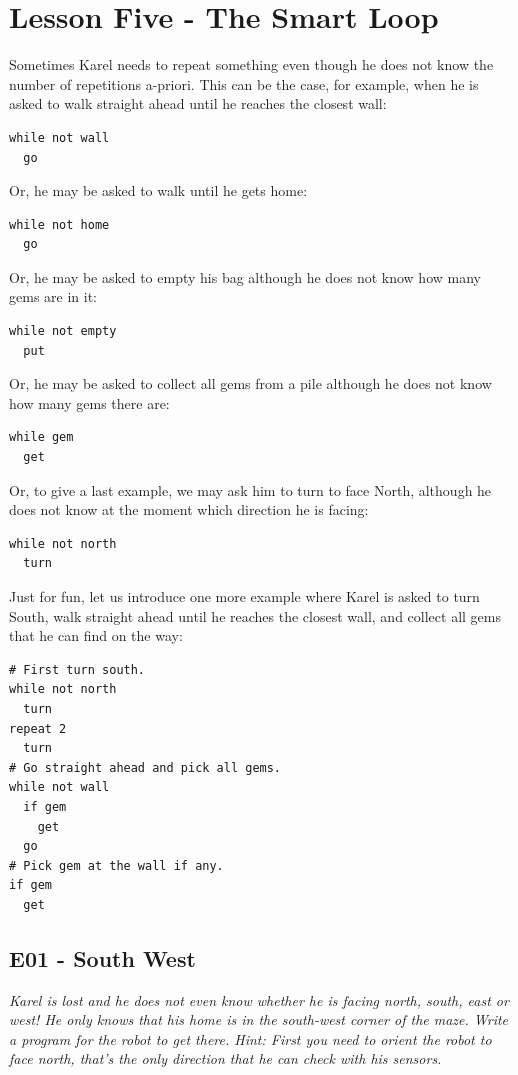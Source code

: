 \documentclass[article,A4,12pt]{llncs}
\begin{document}
\section{Lesson Five - The Smart Loop}

Sometimes Karel needs to repeat something even though he does not know 
the number of repetitions a-priori. This can be the case, for example, 
when he is asked to walk straight ahead until he reaches the closest wall:

\begin{verbatim}
while not wall
  go
\end{verbatim}
Or, he may be asked to walk until he gets home:

\begin{verbatim}
while not home
  go
\end{verbatim}
Or, he may be asked to empty his bag although he does not know how 
many gems are in it: 
 
\begin{verbatim}
while not empty
  put
\end{verbatim}
Or, he may be asked to collect all gems from a pile although he does
not know how many gems there are:

\begin{verbatim}
while gem
  get
\end{verbatim}
Or, to give a last example, we may ask him to turn to face North, 
although he does not know at the moment which direction he is
facing:

\begin{verbatim}
while not north
  turn
\end{verbatim}
Just for fun, let us introduce one more example where Karel is asked to 
turn South, walk straight ahead until he reaches the closest wall, and 
collect all gems that he can find on the way:

\begin{verbatim}
# First turn south.
while not north
  turn
repeat 2
  turn
# Go straight ahead and pick all gems.
while not wall
  if gem
    get
  go
# Pick gem at the wall if any.
if gem
  get
\end{verbatim}


\subsection{E01 - South West}

{\em Karel is lost and he does not even know whether he is facing north, south, east or west! He only knows that his home is in the south-west corner of the maze. Write a program for the robot to get there. Hint: First you need to orient the robot to face north, that's the only direction that he can check with his sensors.}
\end{document}
